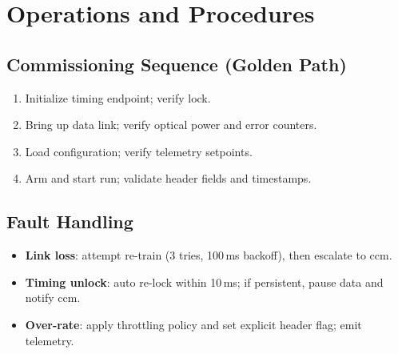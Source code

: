 
\section{Operations and Procedures}
\label{sec:ops}
\subsection{Commissioning Sequence (Golden Path)}
\begin{enumerate}
  \item Initialize timing endpoint; verify lock.
  \item Bring up data link; verify optical power and error counters.
  \item Load configuration; verify telemetry setpoints.
  \item Arm and start run; validate header fields and timestamps.
\end{enumerate}

\subsection{Fault Handling}
\begin{itemize}
  \item \textbf{Link loss}: attempt re-train (3 tries, 100\,ms backoff), then escalate to \gls{ccm}.
  \item \textbf{Timing unlock}: auto re-lock within 10\,ms; if persistent, pause data and notify \gls{ccm}.
  \item \textbf{Over-rate}: apply throttling policy and set explicit header flag; emit telemetry.
\end{itemize}
